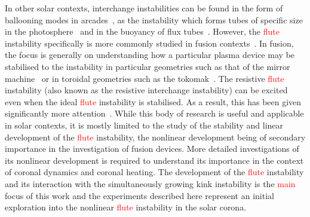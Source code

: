 \documentclass[12pt]{article}
\newcommand{\rs}[2]{\textcolor{red}{#2}}
\begin{document}
In other solar contexts, interchange instabilities can be found in the
form of ballooning modes in
arcades~\cite{hoodBallooningInstabilitiesSolar1986}, as the
instability which forms tubes of specific size in the
photosphere~\cite{bunteInterchangeInstabilitySolar1993} and in the
buoyancy of flux
tubes~\cite{schuesslerInterchangeInstabilitySmall1984}. However, the
\rs{fluting}{flute} instability specifically is more commonly studied in fusion
contexts~\cite{mikhailovskiiInstabilitiesConfinedPlasma1998,zhengAdvancedTokamakStability2015,wessonHydromagneticStabilityTokamaks1978}. In
fusion, the focus is generally on understanding how a particular
plasma device may be stabilised to the instability in particular
geometries such as that of the mirror
machine~\cite{jungwirthTheoryFluteInstability1965} or in toroidal
geometries such as the
tokomak~\cite{shafranovFluteInstabilityCurrentcarrying1968}. The
resistive \rs{fluting}{flute} instability (also known as the resistive interchange
instability) can be excited even when the ideal \rs{fluting}{flute} instability is
stabilised. As a result, this has been given significantly more
attention~\cite{johnsonResistiveInterchangesNegativeV1967,correa-restrepoResistiveBallooningModes1983}. While
this body of research is useful and applicable in solar contexts, it
is mostly limited to the study of the stability and linear development
of the \rs{fluting}{flute} instability, the nonlinear development being of
secondary importance in the investigation of fusion devices. More
detailed investigations of its nonlinear development is required to
understand its importance in the context of coronal dynamics and
coronal heating. The development of the \rs{fluting}{flute} instability and its
interaction with the simultaneously growing kink instability is the
\rs{}{main} focus of this work and the experiments described here represent an
initial exploration into the nonlinear \rs{fluting}{flute} instability in the
solar corona.
\end{document}
